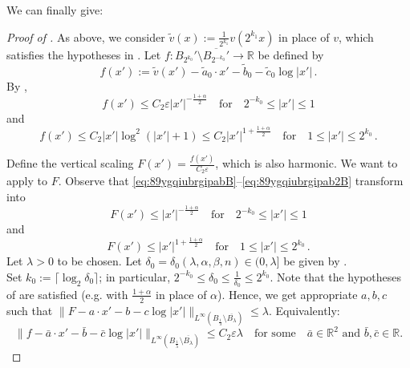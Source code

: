 \documentclass{article}
\newcommand{\R}{\mathbb{R}}
\newcommand{\ep}{\varepsilon}
\theoremstyle{definition}
\begin{document}
We can finally give:
\begin{proof}[Proof of ]
As above, we consider $\widetilde v(x):=\frac{1}{2^{k_1}}v(2^{k_1} x)$ in place of $v$, which satisfies the hypotheses in . Let $f:B_{2^{k_0}}'\setminus \overline{B_{2^{-k_0}}'}\to\R$ be defined by
$$f(x'):=\widetilde v (x')-\widetilde a_0\cdot x'-\widetilde b_0-\widetilde c_0\log|x'|\,.$$
By ,
\begin{equation}\label{eq:89ygqiubrgipabB}
    f(x')\leq C_2\ep|x'|^{-\frac{1+\alpha}{2}}\quad\mbox{for}\quad 2^{-k_0}\leq|x'|\leq 1
\end{equation}
and
\begin{equation}\label{eq:89ygqiubrgipab2B}
    f(x')\leq C_2|x'|\log^2(|x'|+1)\leq C_2|x'|^{1+\frac{1+\alpha}{2}}\quad\mbox{for}\quad 1\leq|x'|\leq 2^{k_0}\,.
\end{equation}

Define the vertical scaling $F(x')=\frac{f(x')}{C_2\ep}$, which is also harmonic.
We want to apply  to $F$. Observe that \eqref{eq:89ygqiubrgipabB}--\eqref{eq:89ygqiubrgipab2B} transform into
\begin{equation*}
    F(x')\leq |x'|^{-\frac{1+\alpha}{2}}\quad\mbox{for}\quad 2^{-k_0}\leq|x'|\leq 1
\end{equation*}
and
\begin{equation*}
    F(x')\leq |x'|^{1+\frac{1+\alpha}{2}}\quad\mbox{for}\quad 1\leq|x'|\leq 2^{k_0}\,.
\end{equation*}
Let $\lambda>0$ to be chosen. Let $\delta_0=\delta_0(\lambda,\alpha,\beta,n)\in(0,\lambda]$ be given by .\\

Set $k_0:=\lceil\log_2 \delta_0\rceil$; in particular, $2^{-k_0}\leq \delta_0\leq \frac{1}{\delta_0}\leq 2^{k_0}$.
Note that the hypotheses of  are satisfied (e.g. with $\frac{1+\alpha}{2}$ in place of $\alpha$). Hence, we get appropriate $a,b,c$ such that $\|F-a\cdot x'-b-c\log|x'|\|_{L^\infty(B_{\frac{1}{\lambda}}\setminus \overline{B_{\lambda}})
}\leq \lambda$. Equivalently:
\begin{equation*}
    \|f-\bar a\cdot x'-\bar b -\bar c\log|x'|\|_{L^\infty(B_{\frac{1}{\lambda}}\setminus \overline{B_{\lambda}})
}\leq C_2\ep\lambda\quad\mbox{for some}\quad \bar a\in\R^{2}\mbox{ and }\bar b,\bar c\in\R.
\end{equation*}




\end{proof}
\end{document}
